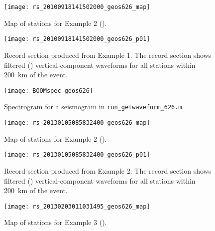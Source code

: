 \documentclass[11pt,titlepage,fleqn]{article}
\begin{document}

\appendix


\clearpage\pagebreak
\begin{figure}
\centering
\texttt{[image: rs\_20100918141502000\_geos626\_map]}
\caption[]
{{
Map of stations for Example 2 ().
}}
\label{fig:map_ex01}
\end{figure}

\clearpage\pagebreak
\begin{figure}
\hspace{-1.25cm}
\texttt{[image: rs\_20100918141502000\_geos626\_p01]}
\caption[]
{{
Record section produced from Example 1.
The record section shows filtered () vertical-component waveforms for all stations within 200~km of the event.
}}
\label{fig:rs_ex01}
\end{figure}

\clearpage\pagebreak
\begin{figure}
\centering
\texttt{[image: BOOMspec\_geos626]}
\caption[]
{{
Spectrogram for a seismogram in {\tt run\_getwaveform\_626.m}.
}}
\label{fig:BOOM}
\end{figure}


\clearpage\pagebreak
\begin{figure}
\centering
\texttt{[image: rs\_20130105085832400\_geos626\_map]}
\caption[]
{{
Map of stations for Example 2 ().
}}
\label{fig:map_ex02}
\end{figure}

\clearpage\pagebreak
\begin{figure}
\hspace{-1.25cm}
\texttt{[image: rs\_20130105085832400\_geos626\_p01]}
\caption[]
{{
Record section produced from Example 2.
The record section shows filtered () vertical-component waveforms for all stations within 200~km of the event.
}}
\label{fig:rs_ex02}
\end{figure}


\clearpage\pagebreak
\begin{figure}
\centering
\texttt{[image: rs\_20130203011031495\_geos626\_map]}
\caption[]
{{
Map of stations for Example 3 ().
}}
\label{fig:map_ex03}
\end{figure}
\end{document}
